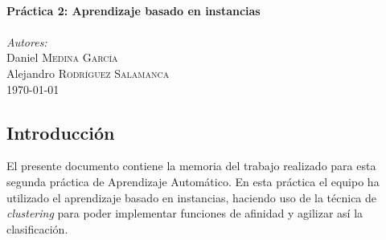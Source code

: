 \documentclass[12pt]{article}
\begin{document}
\begin{titlepage}
\HRule \\[0.7cm]
{ \huge \bfseries Práctica 2: Aprendizaje basado en instancias}\\[0.4cm] %
\HRule \\[0.7cm]


\emph{Autores:}\\
Daniel \textsc{Medina García}\\ %
Alejandro \textsc{Rodríguez Salamanca}\\[1.1cm] %


{\large \today}\\ %


\vfill %

\end{titlepage}


\tableofcontents

\newpage
\thispagestyle{empty}
\clearpage
\vspace*{\fill}
\begin{center}
    \begin{minipage}{\textwidth}
        \begin{center}
            \section*{Introducción}
            El presente documento contiene la memoria del trabajo realizado para esta segunda práctica de Aprendizaje Automático. En esta práctica el equipo ha utilizado el aprendizaje basado en instancias, haciendo uso de la técnica de \emph{clustering} para poder implementar funciones de afinidad y agilizar así la clasificación.

        \end{center}
    \end{minipage}
\end{center}
\vfill
\end{document}
